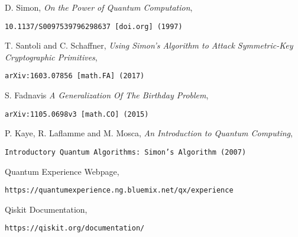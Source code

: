 \documentclass[11pt]{article}
\begin{document}

{}

\begin{thebibliography}{9}



D. Simon, \emph{On the Power of Quantum Computation}, \begin{e} \tt{10.1137/S0097539796298637 [doi.org] (1997)} \end{e}

T. Santoli and C. Schaffner, \emph{Using Simon's Algorithm to Attack Symmetric-Key Cryptographic Primitives}, \begin{e} {\tt arXiv:1603.07856  [math.FA] (2017)} \end{e}

S. Fadnavis \emph{A Generalization Of The Birthday Problem}, \begin{e}{\tt arXiv:1105.0698v3 [math.CO] (2015)} \end{e}

P. Kaye, R. Laflamme and M. Mosca, \emph{An Introduction to Quantum Computing}, \begin{e}{\tt Introductory Quantum Algorithms: Simon's Algorithm (2007)} \end{e}

Quantum Experience Webpage, \begin{e} \tt{https://quantumexperience.ng.bluemix.net/qx/experience} \end{e}

Qiskit Documentation, \begin{e} \tt{https://qiskit.org/documentation/} \end{e}





\end{thebibliography}
\end{document}
